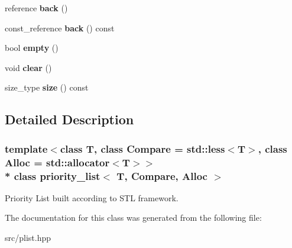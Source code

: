 \begin{DoxyCompactItemize}
\item 
reference {\bfseries back} ()\hypertarget{classpriority__list_a0131e78b34c9ff524f6f02620a12dbae}{}\label{classpriority__list_a0131e78b34c9ff524f6f02620a12dbae}

\item 
const\+\_\+reference {\bfseries back} () const \hypertarget{classpriority__list_a8cd8ed54ac3219b2d37930ec98dc1eba}{}\label{classpriority__list_a8cd8ed54ac3219b2d37930ec98dc1eba}

\item 
bool {\bfseries empty} ()\hypertarget{classpriority__list_a29e7864ed85265915906d4814ea6e944}{}\label{classpriority__list_a29e7864ed85265915906d4814ea6e944}

\item 
void {\bfseries clear} ()\hypertarget{classpriority__list_accb8e806ed4243908f739c7668ee2b50}{}\label{classpriority__list_accb8e806ed4243908f739c7668ee2b50}

\item 
size\+\_\+type {\bfseries size} () const \hypertarget{classpriority__list_a73a1010598abca735a909e032ea17b8e}{}\label{classpriority__list_a73a1010598abca735a909e032ea17b8e}

\end{DoxyCompactItemize}


\subsection{Detailed Description}
\subsubsection*{template$<$class T, class Compare = std\+::less$<$\+T$>$, class Alloc = std\+::allocator$<$\+T$>$$>$\\*
class priority\+\_\+list$<$ T, Compare, Alloc $>$}

Priority List built according to S\+TL framework. 

The documentation for this class was generated from the following file\+:\begin{DoxyCompactItemize}
\item 
src/plist.\+hpp\end{DoxyCompactItemize}

